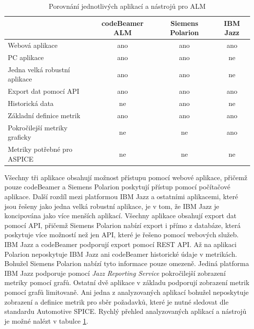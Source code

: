 \documentclass[czech,master,public,dept460,male,cpdeclaration,oneside]{diploma}
\begin{document}
\begin{table}[htp]
\begin{tabular}{@{}lccc@{}}
\toprule
\textbf{}                     & \textbf{codeBeamer ALM} & \textbf{Siemens Polarion} & \textbf{IBM Jazz} \\ \midrule
Webová aplikace               & ano                     & ano                       & ano               \\
PC aplikace                   & ano                     & ano                       & ne                \\
Jedna velká robustní aplikace & ano                     & ano                       & ne                \\
Export dat pomocí API         & ano                     & ano                       & ano               \\
Historická data               & ne                     & ano                       & ne                \\
Základní definice metrik      & ano                     & ano                       & ano               \\
Pokročilejší metriky graficky & ne                      & ne                        & ano               \\
Metriky potřebné pro ASPICE  & ne                      & ne                        & ne                \\ \bottomrule
\end{tabular}
\caption{Porovnání jednotlivých aplikací a nástrojů pro ALM}
\label{tab:alm_porovnani}
\end{table}

Všechny tři aplikace obsahují možnost přístupu pomocí webové aplikace, přičemž pouze codeBeamer a Siemens Polarion poskytují přístup pomocí počítačové aplikace. Další rozdíl mezi platformou IBM Jazz a ostatními aplikacemi, které jsou řešeny jako jedna velká robustní aplikace, je v tom, že IBM Jazz je koncipována jako více menších aplikací. Všechny aplikace obsahují export dat pomocí API, přičemž Siemens Polarion nabízí export i přímo z databáze, která poskytuje více možností než jen API, které je řešeno pomocí webových služeb. IBM Jazz a codeBeamer podporují export pomocí REST API. Až na aplikaci Polarion neposkytuje IBM Jazz ani codeBeamer historické údaje v metrikách. Bohužel Siemens Polarion nabízí tyto informace pouze omezeně. Jediná platforma IBM Jazz podporuje pomocí \textit{Jazz Reporting Service} pokročilejší zobrazení metriky pomocí grafů. Ostatní dvě aplikace v základu podporují zobrazení metrik pomocí grafů limitovaně. Ani jedna z analyzovaných aplikací bohužel neposkytuje zobrazení a definice metrik pro sběr požadavků, které je nutné sledovat dle standardu Automotive SPICE. Rychlý přehled analyzovaných aplikací a nástrojů je možné nalézt v tabulce \ref{tab:alm_porovnani}. 
\end{document}
